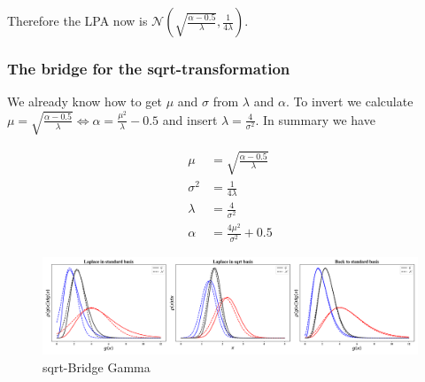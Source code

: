 Therefore the LPA now is $\mathcal{N}\left(\sqrt{\frac{\alpha-0.5}{\lambda}}, \frac{1}{4\lambda} \right)$.

\subsubsection{The bridge for the sqrt-transformation}

We already know how to get $\mu$ and $\sigma$ from $\lambda$ and $\alpha$. To invert we calculate $\mu = \sqrt{\frac{\alpha-0.5}{\lambda}} \Leftrightarrow \alpha = \frac{\mu^2}{\lambda}-0.5$ and insert $\lambda=\frac{4}{\sigma^2}$. In summary we have

\begin{subequations}
\begin{align}
\mu &= \sqrt{\frac{\alpha-0.5}{\lambda}} \\
\sigma^2 &= \frac{1}{4\lambda} \\
\lambda &= \frac{4}{\sigma^2} \\
\alpha &= \frac{4\mu^2}{\sigma^2}+0.5 
\end{align}
\end{subequations}

\begin{figure}[!htb]
	\centering
	\includegraphics[width=\textwidth]{figures/Gamma_sqrt_bridge.pdf}
	\caption{sqrt-Bridge Gamma}
	\label{fig:gamma_sqrt_bridge}
\end{figure}
